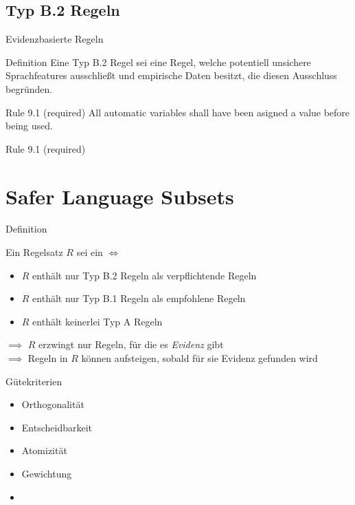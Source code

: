 \documentclass{beamer}
\begin{document}
    \subsection{Typ B.2 Regeln}
    \label{subsec:typ-b-2-regeln}
    \begin{frame}{Evidenzbasierte Regeln}
         {
            \begin{block}{Definition}
                Eine Typ B.2 Regel sei eine Regel, welche potentiell unsichere Sprachfeatures ausschließt und empirische
                Daten besitzt, die diesen Ausschluss begründen.
            \end{block}
            \pause
            \begin{exampleblock}{Rule 9.1 (required)}
                All automatic variables shall have been asigned a value before being used.
            \end{exampleblock}
        }
         {
            \begin{exampleblock}{Rule 9.1 (required)}
                
            \end{exampleblock}
        }
    \end{frame}

    \section{Safer Language Subsets}
    \label{sec:safer-language-subsets}
    \begin{frame}{Definition}
        \begin{block}{Ein Regelsatz $R$ sei ein \sls $\iff$}
            \begin{itemize}
                \item $R$ enthält nur Typ B.2 Regeln als verpflichtende Regeln
                \item $R$ enthält nur Typ B.1 Regeln als empfohlene Regeln
                \item $R$ enthält keinerlei Typ A Regeln
            \end{itemize}
        \end{block}
        $\implies$ $R$ erzwingt nur Regeln, für die es \textit{Evidenz} gibt\\
        $\implies$ Regeln in $R$ können aufsteigen, sobald für sie Evidenz gefunden wird
    \end{frame}

    \begin{frame}{Gütekriterien}
        \begin{itemize}
            \item Orthogonalität
            \item Entscheidbarkeit
            \item Atomizität
            \item Gewichtung
            \item {}
        \end{itemize}
    \end{frame}
\end{document}
